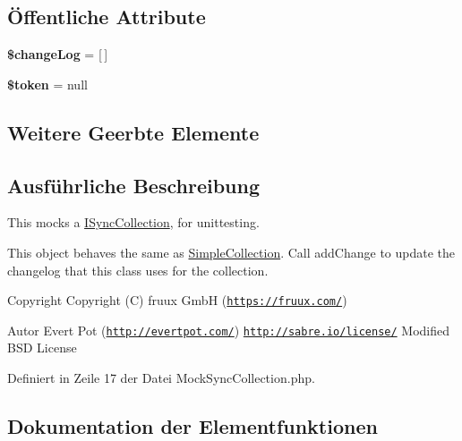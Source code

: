 \subsection*{Öffentliche Attribute}
\begin{DoxyCompactItemize}
\item 
\mbox{\label{class_sabre_1_1_d_a_v_1_1_sync_1_1_mock_sync_collection_a21d9b1616884570f9881fd9bae32538d}} 
{\bfseries \$change\+Log} = \mbox{[}$\,$\mbox{]}
\item 
\mbox{\label{class_sabre_1_1_d_a_v_1_1_sync_1_1_mock_sync_collection_a8cbc3be1c1fe87c053c191b2404a6abf}} 
{\bfseries \$token} = null
\end{DoxyCompactItemize}
\subsection*{Weitere Geerbte Elemente}


\subsection{Ausführliche Beschreibung}
This mocks a \mbox{\hyperlink{interface_sabre_1_1_d_a_v_1_1_sync_1_1_i_sync_collection}{I\+Sync\+Collection}}, for unittesting.

This object behaves the same as \mbox{\hyperlink{class_sabre_1_1_d_a_v_1_1_simple_collection}{Simple\+Collection}}. Call add\+Change to update the \textquotesingle{}changelog\textquotesingle{} that this class uses for the collection.

\begin{DoxyCopyright}{Copyright}
Copyright (C) fruux GmbH (\href{https://fruux.com/}{\tt https\+://fruux.\+com/}) 
\end{DoxyCopyright}
\begin{DoxyAuthor}{Autor}
Evert Pot (\href{http://evertpot.com/}{\tt http\+://evertpot.\+com/})  \href{http://sabre.io/license/}{\tt http\+://sabre.\+io/license/} Modified B\+SD License 
\end{DoxyAuthor}


Definiert in Zeile 17 der Datei Mock\+Sync\+Collection.\+php.



\subsection{Dokumentation der Elementfunktionen}
\mbox{\label{class_sabre_1_1_d_a_v_1_1_sync_1_1_mock_sync_collection_a22c2494bef62d74a044ee7b6f79c4f2f}} 
